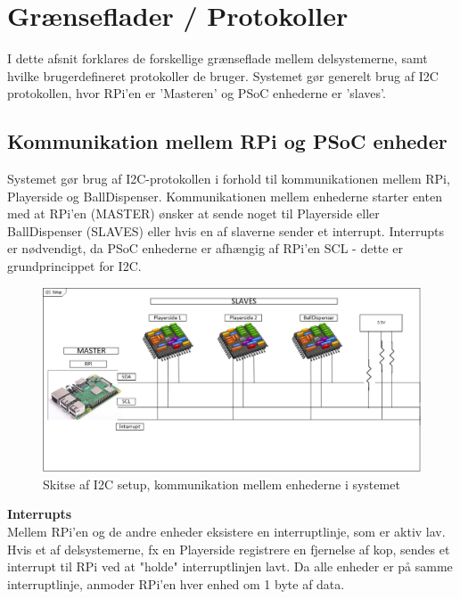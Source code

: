 \documentclass[Arkitektur/System_main.tex]{subfiles}
\begin{document}
\section{Grænseflader / Protokoller} \label{sec:protocols}
I dette afsnit forklares de forskellige grænseflade mellem delsystemerne, samt hvilke brugerdefineret protokoller de bruger. Systemet gør generelt brug af I2C protokollen, hvor RPi'en er 'Masteren' og PSoC enhederne er 'slaves'. 


\subsection{Kommunikation mellem RPi og PSoC enheder} \label{sec:RPi_PSoC_com}


Systemet gør brug af I2C-protokollen i forhold til kommunikationen mellem RPi, Playerside og BallDispenser. Kommunikationen mellem enhederne starter enten med at RPi'en (MASTER) ønsker at sende noget til Playerside eller BallDispenser (SLAVES) eller hvis en af slaverne sender et interrupt. Interrupts er nødvendigt, da PSoC enhederne er afhængig af RPi'en SCL - dette er grundprincippet for I2C. 

\begin{figure}[H]
    \centering
    \includegraphics[width=\textwidth]{Arkitektur/Grenseflader/Graphics/I2C.png}
    \caption{Skitse af I2C setup, kommunikation mellem enhederne i systemet}
    \label{fig:i2c_setup}
\end{figure}

\textbf{Interrupts}
\\Mellem RPi'en og de andre enheder eksistere en interruptlinje, som er aktiv lav. Hvis et af delsystemerne, fx en Playerside registrere en fjernelse af kop, sendes et interrupt til RPi ved at "holde" interruptlinjen lavt. Da alle enheder er på samme interruptlinje, anmoder RPi'en hver enhed om 1 byte af data.
\end{document}

